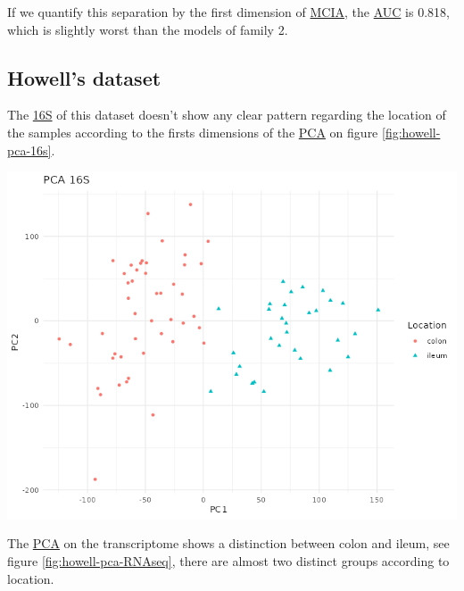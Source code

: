 \documentclass[
  12pt,
  a4paper,
  twoside,
  openright]{book}
\let\origfigure\figure
\let\endorigfigure\endfigure
\renewenvironment{figure}[1][2] {
    \expandafter\origfigure\expandafter[!htbp]
} {
    \endorigfigure
}
\begin{document}
If we quantify this separation by the first dimension of \protect\hyperlink{acronyms_MCIA}{MCIA}, the \protect\hyperlink{acronyms_AUC}{AUC} is 0.818, which is slightly worst than the models of family 2.

\FloatBarrier

\hypertarget{results-howell}{%
\subsection{Howell's dataset}\label{results-howell}}

The \protect\hyperlink{acronyms_16S}{16S} of this dataset doesn't show any clear pattern regarding the location of the samples according to the firsts dimensions of the \protect\hyperlink{acronyms_PCA}{PCA} on figure \ref{fig:howell-pca-16s}.

\begin{figure}
\includegraphics[width=1\linewidth]{images/howell_PCA_16S} \caption[PCA of 16S data from the Howell dataset]{PCA of 16S data from the Howell dataset. The first component separates the samples by their location. Each point represents a sample (colored and shaped by location).}\label{fig:howell-pca-16s}
\end{figure}

The \protect\hyperlink{acronyms_PCA}{PCA} on the transcriptome shows a distinction between colon and ileum, see figure \ref{fig:howell-pca-RNAseq}, there are almost two distinct groups according to location.
\end{document}
